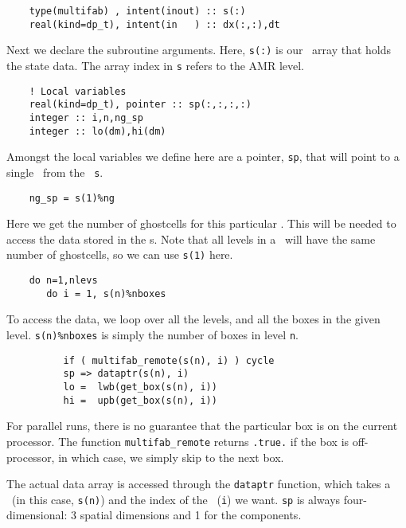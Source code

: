 \begin{verbatim}
    type(multifab) , intent(inout) :: s(:)
    real(kind=dp_t), intent(in   ) :: dx(:,:),dt
\end{verbatim}

\noindent Next we declare the subroutine arguments.  Here, {\tt s(:)}
is our \multifab\ array that holds the state data.  The array index
in {\tt s} refers to the AMR level.

\begin{verbatim}
    ! Local variables
    real(kind=dp_t), pointer :: sp(:,:,:,:)
    integer :: i,n,ng_sp
    integer :: lo(dm),hi(dm)
\end{verbatim}

\noindent Amongst the local variables we define here are a pointer,
{\tt sp}, that will point to a single \fab\ from the
\multifab\ {\tt s}.

\begin{verbatim}
    ng_sp = s(1)%ng
\end{verbatim}

\noindent Here we get the number of ghostcells for this particular
\multifab.  This will be needed to access the data stored in the
\fab s.  Note that all levels in a \multifab\ will have the same
number of ghostcells, so we can use {\tt s(1)} here.

\begin{verbatim}
    do n=1,nlevs
       do i = 1, s(n)%nboxes
\end{verbatim}

\noindent To access the data, we loop over all the levels, and
all the boxes in the given level.  {\tt s(n)\%nboxes} is simply
the number of boxes in level {\tt n}.

\begin{verbatim}
          if ( multifab_remote(s(n), i) ) cycle
          sp => dataptr(s(n), i)
          lo =  lwb(get_box(s(n), i))
          hi =  upb(get_box(s(n), i))
\end{verbatim}

\noindent For parallel runs, there is no guarantee that the particular
box is on the current processor.  The function {\tt multifab\_remote}
returns {\tt .true.} if the box is off-processor, in which case, we 
simply skip to the next box.

The actual data array is accessed through the {\tt dataptr} function,
which takes a \multifab\ (in this case, {\tt s(n)}) and the index of
the \boxtype\ ({\tt i}) we want.  {\tt sp} is always four-dimensional:
3 spatial dimensions and 1 for the components.


